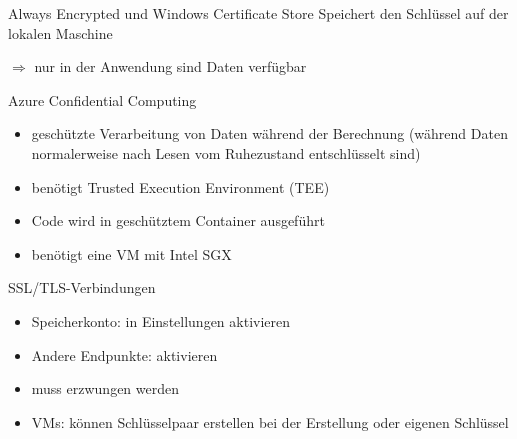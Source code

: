 \begin{flashcard}[Definition]{Always Encrypted und Windows Certificate Store}
    Speichert den Schlüssel auf der lokalen Maschine

    \vspace{1cm}
    $\Rightarrow$ nur in der Anwendung sind Daten verfügbar
\end{flashcard}


\begin{flashcard}[Definition]{Azure Confidential Computing}
    \begin{itemize}
        \item geschützte Verarbeitung von Daten während der Berechnung\newline
            (während Daten normalerweise nach Lesen vom Ruhezustand entschlüsselt sind)
        \item benötigt Trusted Execution Environment (TEE)
        \item Code wird in geschütztem Container ausgeführt
        \item benötigt eine VM mit Intel SGX
    \end{itemize}
\end{flashcard}


\begin{flashcard}[Definition]{SSL/TLS-Verbindungen}
    \begin{itemize}
        \item Speicherkonto: in Einstellungen aktivieren
        \item Andere Endpunkte: aktivieren
        \item[$\Rightarrow$] muss erzwungen werden
        \item VMs: können Schlüsselpaar erstellen bei der Erstellung oder eigenen Schlüssel
    \end{itemize}
\end{flashcard}

